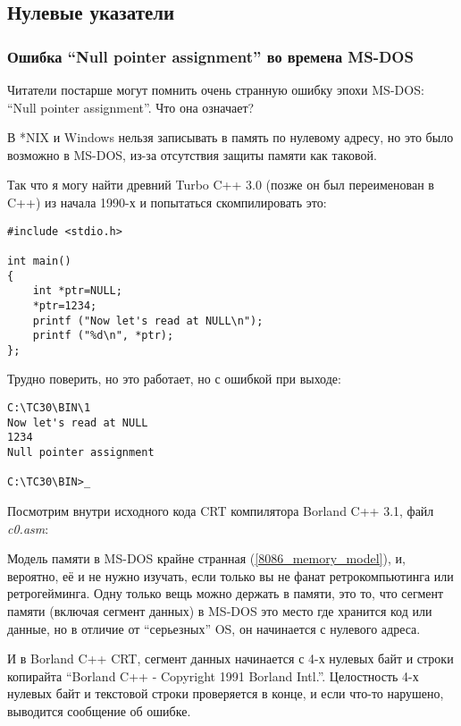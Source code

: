 \subsection{Нулевые указатели}

\subsubsection{Ошибка ``Null pointer assignment'' во времена MS-DOS}

Читатели постарше могут помнить очень странную ошибку эпохи MS-DOS: ``Null pointer assignment''.
Что она означает?

В *NIX и Windows нельзя записывать в память по нулевому адресу, но это было возможно в MS-DOS, из-за отсутствия
защиты памяти как таковой.

Так что я могу найти древний Turbo C++ 3.0 (позже он был переименован в C++) из начала 1990-х и попытаться
скомпилировать это:

\begin{lstlisting}[style=customc]
#include <stdio.h>

int main()
{
	int *ptr=NULL;
	*ptr=1234;
	printf ("Now let's read at NULL\n");
	printf ("%d\n", *ptr);
};
\end{lstlisting}

Трудно поверить, но это работает, но с ошибкой при выходе:

\begin{lstlisting}[caption=Древний Turbo C++ 3.0]
C:\TC30\BIN\1
Now let's read at NULL
1234
Null pointer assignment

C:\TC30\BIN>_
\end{lstlisting}

Посмотрим внутри исходного кода \ac{CRT} компилятора Borland C++ 3.1, файл \emph{c0.asm}:



Модель памяти в MS-DOS крайне странная (\ref{8086_memory_model}), и, вероятно, её и не нужно изучать, если только вы не фанат ретрокомпьютинга
или ретрогейминга.
Одну только вещь можно держать в памяти, это то, что сегмент памяти (включая сегмент данных) в MS-DOS это место где
хранится код или данные, но в отличие от ``серьезных'' \ac{OS}, он начинается с нулевого адреса.

И в Borland C++ \ac{CRT}, сегмент данных начинается с 4-х нулевых байт и строки копирайта
``Borland C++ - Copyright 1991 Borland Intl.''.
Целостность 4-х нулевых байт и текстовой строки проверяется в конце, и если что-то нарушено, выводится сообщение об ошибке.


